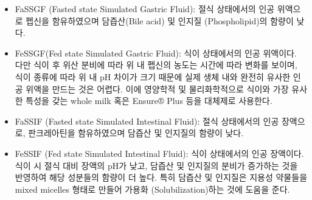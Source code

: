 \documentclass[
  11pt,
  krantz2, a4paper, twoside]{krantz}
\providecommand{\tightlist}{%
  \setlength{\itemsep}{0pt}\setlength{\parskip}{0pt}}
\begin{document}
\begin{itemize}
\tightlist
\item
  FaSSGF (Fasted state Simulated Gastric Fluid): 절식 상태에서의 인공
  위액으로 펩신을 함유하였으며 담즙산(Bile acid) 및 인지질
  (Phospholipid)의 함량이 낮다.
\item
  FeSSGF(Fed state Simulated Gastric Fluid): 식이 상태에서의 인공
  위액이다. 다만 식이 후 위산 분비에 따라 위 내 펩신의 농도는 시간에
  따라 변화를 보이며, 식이 종류에 따라 위 내 pH 차이가 크기 때문에
  실제 생체 내와 완전히 유사한 인공 위액을 만드는 것은 어렵다. 이에
  영양학적 및 물리화학적으로 식이와 가장 유사한 특성을 갖는 whole milk
  혹은 Ensure® Plus 등을 대체제로 사용한다.
\item
  FaSSIF (Fasted state Simulated Intestinal Fluid): 절식 상태에서의
  인공 장액으로, 판크레아틴을 함유하였으며 담즙산 및 인지질의 함량이
  낮다.
\item
  FeSSIF (Fed state Simulated Intestinal Fluid): 식이 상태에서의 인공
  장액이다. 식이 시 절식 대비 장액의 pH가 낮고, 담즙산 및 인지질의
  분비가 증가하는 것을 반영하여 해당 성분들의 함량이 더 높다. 특히
  담즙산 및 인지질은 지용성 약물들을 mixed micelles 형태로 만들어
  가용화 (Solubilization)하는 것에 도움을 준다.
\end{itemize}
\end{document}
